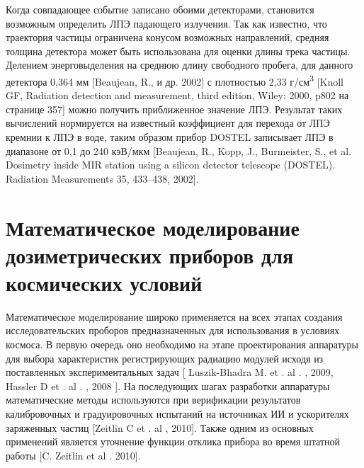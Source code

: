 Когда совпадающее событие записано обоими детекторами, становится возможным определить ЛПЭ падающего излучения. Так как известно, что траектория частицы ограничена конусом возможных направлений, средняя толщина детектора может быть использована для оценки длины трека частицы. Делением энерговыделения на среднюю длину свободного пробега, для данного детектора 0,364 мм [Beaujean, R., и др. 2002] с плотностью 2,33 г/см\textsuperscript{3} [Knoll GF, Radiation detection and measurement, third edition, Wiley: 2000, p802  на странице 357]  можно получить приближенное значение ЛПЭ. Результат таких вычислений нормируется на известный коэффициент для перехода от ЛПЭ кремнии к ЛПЭ в воде, таким образом прибор DOSTEL записывает ЛПЭ в диапазоне от 0,1 до 240 кэВ/мкм [Beaujean, R., Kopp, J., Burmeister, S., et al. Dosimetry inside MIR station using a silicon detector telescope (DOSTEL). Radiation Measurements 35, 433--438, 2002].


\section{Математическое моделирование дозиметрических приборов для космических условий}

Математическое моделирование широко применяется на всех этапах создания исследовательских проборов предназначенных для использования в условиях космоса. В первую очередь оно необходимо на этапе проектирования аппаратуры для выбора характеристик регистрирующих радиацию модулей исходя из поставленных экспериментальных задач [ Luszik-Bhadra M.  et . al . ,  2009,  Hassler  D et .  al . ,  2008 ]. На последующих шагах разработки аппаратуры математические методы используются при верификации результатов калибровочных и градуировочных испытаний на источниках ИИ и ускорителях заряженных частиц [Zeitlin C et . al ,  2010]. Также одним из основных применений является уточнение функции отклика прибора во время штатной работы [C. Zeitlin et al . 2010]. 


